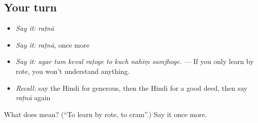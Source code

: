\subsection*{Your turn}
\begin{itemize}
\raggedright
  \item \emph{Say it:} \emph{raṭnā}
  \item \emph{Say it:} \emph{raṭnā}, once more
  \item \emph{Say it:} \emph{agar tum keval raṭoge to kuch nahīṃ samjhoge.} — If you only learn by rote, you won't understand anything.
  \item \emph{Recall:} say the Hindi for generous, then the Hindi for a good deed, then say \emph{raṭnā} again
\end{itemize}

\begin{tcolorbox}[breakable,colback=teal!4,colframe=teal!35!black,title={Before you move on}]
What does  mean? (\textquotedblleft{}To learn by rote, to cram\textquotedblright{}.) Say it once more.
\end{tcolorbox}
